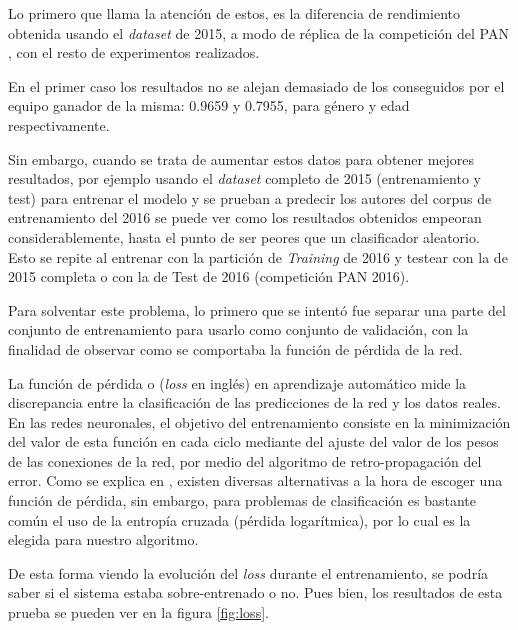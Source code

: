 Lo primero que llama la atención de estos, es la diferencia de rendimiento obtenida usando el \textit{dataset} de 2015, a modo de réplica de la competición del PAN \citep{pan:2015}, con el resto de experimentos realizados.

En el primer caso los resultados no se alejan demasiado de los conseguidos por el equipo ganador de la misma: 0.9659 y 0.7955, para género y edad respectivamente.

Sin embargo, cuando se trata de aumentar estos datos para obtener mejores resultados, por ejemplo usando el \textit{dataset} completo de 2015 (entrenamiento y test) para entrenar el modelo y se prueban a predecir los autores del corpus de entrenamiento del 2016 se puede ver como los resultados obtenidos empeoran considerablemente, hasta el punto de ser peores que un clasificador aleatorio. Esto se repite al entrenar con la partición de \textit{Training} de 2016 y testear con la de 2015 completa o con la de Test de 2016 (competición PAN 2016).

Para solventar este problema, lo primero que se intentó fue separar una parte del conjunto de entrenamiento para usarlo como conjunto de validación, con la finalidad de observar como se comportaba la función de pérdida de la red.


La función de pérdida o (\textit{loss} en inglés) en aprendizaje automático mide la discrepancia entre la clasificación de las predicciones de la red y los datos reales. En las redes neuronales, el objetivo del entrenamiento consiste en la minimización del valor de esta función en cada ciclo mediante del ajuste del valor de los pesos de las conexiones de la red, por medio del algoritmo de retro-propagación del error. Como se explica en \citet{janocha2017loss}, existen diversas alternativas a la hora de escoger una función de pérdida, sin embargo, para problemas de clasificación es bastante común el uso de la entropía cruzada (pérdida logarítmica), por lo cual es la elegida para nuestro algoritmo.

De esta forma viendo la evolución del \textit{loss} durante el entrenamiento, se podría saber si el sistema estaba sobre-entrenado o no. Pues bien, los resultados de esta prueba se pueden ver en la figura \ref{fig:loss}.

